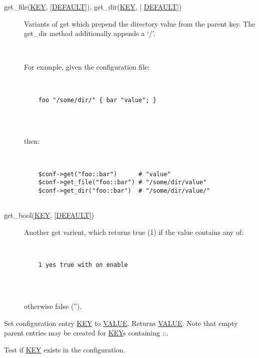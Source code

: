 \documentclass[]{article}
\renewcommand{\emph}[1]{\underline{#1}}
\begin{document}
\begin{description}
\item[get\_file(\emph{KEY}, {[}\emph{DEFAULT}{]}), get\_dir(\emph{KEY},
{[} \emph{DEFAULT}{]})]
Variants of get which prepend the directory value from the parent key.
The get\_dir method additionally appends a `/'.

~

For example, given the configuration file:

~

\begin{verbatim}
    foo "/some/dir/" { bar "value"; }
    
\end{verbatim}

~

then:

~

\begin{verbatim}
    $conf->get("foo::bar")      # "value"
    $conf->get_file("foo::bar") # "/some/dir/value"
    $conf->get_dir("foo::bar")  # "/some/dir/value/"
    
\end{verbatim}
\end{description}

\begin{description}
\item[get\_bool(\emph{KEY}, {[}\emph{DEFAULT}{]})]
Another get varient, which returns true (1) if the value contains any
of:

~

\begin{verbatim}
    1 yes true with on enable
    
\end{verbatim}

~

otherwise false ('').
\end{description}

\begin{description}
\itemsep1pt\parskip0pt
\item[set(\emph{KEY}, \emph{VALUE})]
Set configuration entry \emph{KEY} to \emph{VALUE}. Returns
\emph{VALUE}. Note that empty parent entries may be created for
\emph{KEY}s containing ::.
\end{description}

\begin{description}
\itemsep1pt\parskip0pt
\item[exists(\emph{KEY})]
Test if \emph{KEY} exists in the configuration.
\end{description}
\end{document}
